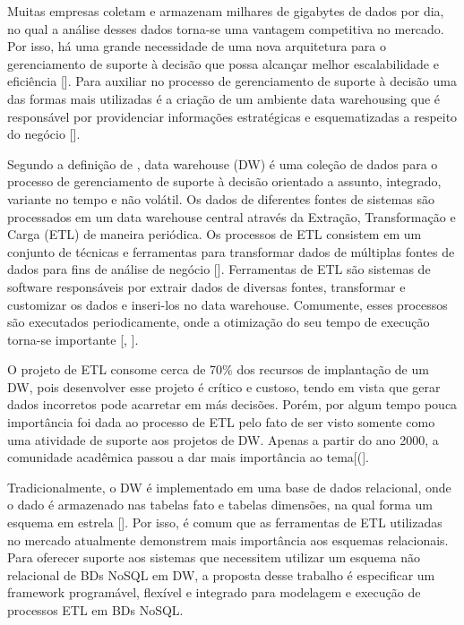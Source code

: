 Muitas empresas coletam e armazenam milhares de gigabytes de dados por dia, no qual a análise desses dados torna-se uma vantagem competitiva no mercado. Por isso, há uma grande necessidade de uma nova arquitetura para o gerenciamento de suporte à decisão que possa alcançar melhor escalabilidade e eficiência [\cite{liu:2013}]. Para auxiliar no processo de gerenciamento de suporte à decisão uma das formas mais utilizadas é a criação de um ambiente data warehousing que é responsável por providenciar informações estratégicas e esquematizadas a respeito do negócio [\cite{dayal:1997}].

Segundo a definição de \cite{kimball:2002}, data warehouse (DW) é uma coleção de dados para o processo de gerenciamento de suporte à decisão orientado a assunto, integrado, variante no tempo e não volátil. Os dados de diferentes fontes de sistemas são processados em um data warehouse central através da Extração, Transformação e Carga (ETL) de maneira periódica. Os processos de ETL consistem em um conjunto de técnicas e ferramentas para transformar dados de múltiplas fontes de dados para fins de análise de negócio [\cite{silva:2016}]. Ferramentas de ETL são sistemas de software responsáveis por extrair dados de diversas fontes, transformar e customizar os dados e inseri-los no data warehouse. Comumente, esses processos são executados periodicamente, onde a otimização do seu tempo de execução torna-se importante [\cite{vassiliadis:2005}, \cite{silva:2016}].

O projeto de ETL consome cerca de 70\% dos recursos de implantação de um DW, pois desenvolver esse projeto é crítico e custoso, tendo em vista que gerar dados incorretos pode acarretar em más decisões. Porém, por algum tempo pouca importância foi dada ao processo de ETL pelo fato de ser visto somente como uma atividade de suporte aos projetos de DW. Apenas a partir do ano 2000, a comunidade acadêmica passou a dar mais importância ao tema[(\cite{silva:2012}].

Tradicionalmente, o DW é implementado em uma base de dados relacional, onde o dado é armazenado nas tabelas fato e tabelas dimensões, na qual forma um esquema em estrela [\cite{kimball:2002}]. Por isso, é comum que as ferramentas de ETL utilizadas no mercado atualmente demonstrem mais importância aos esquemas relacionais. Para oferecer suporte aos sistemas que necessitem utilizar um esquema não relacional de BDs NoSQL em DW, a proposta desse trabalho é especificar um framework programável, flexível e integrado para modelagem e execução de processos ETL em BDs NoSQL.

